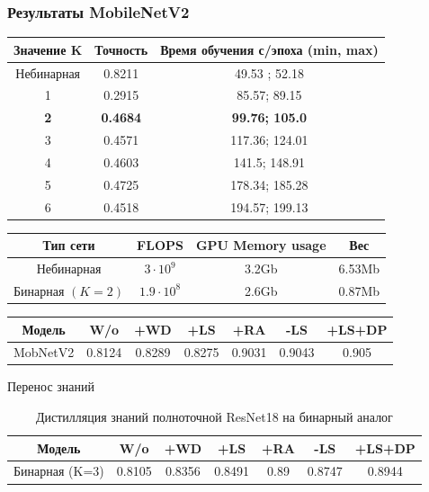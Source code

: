 \documentclass[usenames,dvipsnames, 10pt]{beamer}
\begin{document}
\begin{frame}
\frametitle{Результаты MobileNetV2}
    \centering
    \vskip -0.4cm
    \begin{tabular}{|c|c|c|}
        \hline
        Значение K & Точность & Время обучения с/эпоха (min, max) \\
        \hline
        Небинарная & 0.8211 & 49.53 ; 52.18 \\
        1 & 0.2915 & 85.57; 89.15 \\
        \textbf{2} & \textbf{0.4684} & \textbf{99.76; 105.0} \\
        3 & 0.4571 & 117.36; 124.01\\
        4 & 0.4603 & 141.5; 148.91\\
        5 & 0.4725 & 178.34; 185.28\\
        6 & 0.4518 & 194.57; 199.13\\
        \hline
    \end{tabular}
    \vskip 0.3cm
    \begin{tabular}{|c|c|c|c|}
        \hline
        Тип сети & FLOPS & GPU Memory usage & Вес  \\
        \hline
        Небинарная & $3 \cdot 10^{9}$ & 3.2Gb & 6.53Mb \\
        Бинарная $(K=2)$ & $1.9 \cdot 10^{8}$ & 2.6Gb & 0.87Mb \\
        \hline
    \end{tabular}
    \vskip 0.3cm
    \centering
    \begin{tabular}{|c|c|c|c|c|c|c|}
        \hline
        Модель & W/o & +WD & +LS & +RA & -LS & +LS+DP \\
        \hline
         MobNetV2 & 0.8124 & 0.8289 & 0.8275 & 0.9031 & 0.9043 & 0.905 \\
        \hline
    \end{tabular}
\end{frame}

\begin{frame}{Перенос знаний}
    \centering
    \begin{table}[h]
    \begin{tabular}{|c|c|c|c|c|c|c|}
        \hline
        Модель & W/o & +WD & +LS & +RA & -LS & +LS+DP \\
        \hline
         Бинарная (K=3)& 0.8105 & 0.8356 & 0.8491 & 0.89 & 0.8747 & 0.8944 \\
        \hline
    \end{tabular}
    \caption{\centering Дистилляция знаний полноточной ResNet18 на бинарный аналог}
    \label{tab: Distillation}
    \end{table}
\end{frame}
\end{document}
